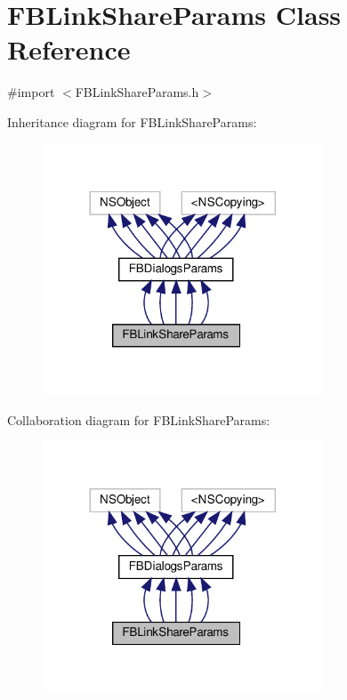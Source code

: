 \hypertarget{interfaceFBLinkShareParams}{}\section{F\+B\+Link\+Share\+Params Class Reference}
\label{interfaceFBLinkShareParams}


{\ttfamily \#import $<$F\+B\+Link\+Share\+Params.\+h$>$}



Inheritance diagram for F\+B\+Link\+Share\+Params\+:
\nopagebreak
\begin{figure}[H]
\begin{center}
\leavevmode
\includegraphics[width=236pt]{interfaceFBLinkShareParams__inherit__graph}
\end{center}
\end{figure}


Collaboration diagram for F\+B\+Link\+Share\+Params\+:
\nopagebreak
\begin{figure}[H]
\begin{center}
\leavevmode
\includegraphics[width=236pt]{interfaceFBLinkShareParams__coll__graph}
\end{center}
\end{figure}
